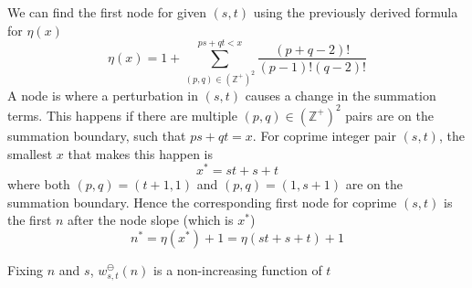 \documentclass[]{article}
\begin{document}
We can find the first node for given $(s, t)$ using the previously derived formula for $\eta(x)$
\[
\eta(x) = 1 + \sum_{(p,q)\in(\mathbb{Z}^+)^2}^{ps+qt<x}\frac{(p+q-2)!}{(p-1)!(q-2)!}
\]
A node is where a perturbation in $(s, t)$ causes a change in the summation terms. This happens if there are multiple $(p,q)\in(\mathbb{Z}^+)^2$ pairs are on the summation boundary, such that $ps+qt = x$. For coprime integer pair $(s, t)$, the smallest $x$ that makes this happen is
\[
x^* = st + s + t
\]
where both $(p,q) = (t+1, 1)$ and $(p,q) = (1, s+1)$ are on the summation boundary. Hence the corresponding first node for coprime $(s,t)$ is the first $n$ after the node slope (which is $x^*$)
\[
n^* = \eta(x^*) + 1 = \eta(st + s + t) + 1
\]

\vspace{1cm}
\begin{lemma}
		Fixing $n$ and $s$, $w^{\ominus}_{s,t}(n)$ is a non-increasing function of $t$
\end{lemma}
\end{document}
